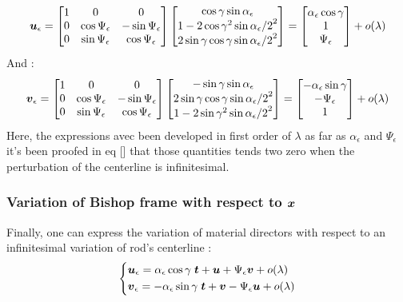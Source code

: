 \begin{equation}
	\boldsymbol{u}_\epsilon =
	\begin{bmatrix}
		1 & 0 & 0 \\
		0 & \cos{\Psi_\epsilon} & -\sin{\Psi_\epsilon} \\
		0 & \sin{\Psi_\epsilon} & \cos{\Psi_\epsilon} 
	\end{bmatrix}
	\begin{bmatrix}
		\cos{\gamma}\sin{\alpha_\epsilon} \\
		1-2\cos{\gamma}^2\sin{\alpha_\epsilon/2}^2 \\
		2\sin{\gamma}\cos{\gamma}\sin{\alpha_\epsilon/2}^2
	\end{bmatrix}
	=
	\begin{bmatrix}
		\alpha_\epsilon\cos{\gamma}\\
		1 \\
		\Psi_\epsilon
	\end{bmatrix}
	+ o(\lambda)
\end{equation}
And :
\begin{equation}
	\boldsymbol{v}_\epsilon =
	\begin{bmatrix}
		1 & 0 & 0 \\
		0 & \cos{\Psi_\epsilon} & -\sin{\Psi_\epsilon} \\
		0 & \sin{\Psi_\epsilon} & \cos{\Psi_\epsilon} 
	\end{bmatrix}
	\begin{bmatrix}
		-\sin{\gamma}\sin{\alpha_\epsilon} \\
		2\sin{\gamma}\cos{\gamma}\sin{\alpha_\epsilon/2}^2 \\
		1-2\sin{\gamma}^2\sin{\alpha_\epsilon/2}^2
	\end{bmatrix}
	=
	\begin{bmatrix}
		-\alpha_\epsilon\sin{\gamma}\\
		-\Psi_\epsilon \\
		1
	\end{bmatrix}
	+ o(\lambda)
\end{equation}
Here, the expressions avec been developed in first order of $\lambda$ as far as $\alpha_\epsilon$ and $\Psi_\epsilon$ it's been proofed in eq [] that those quantities tends two zero when the perturbation of the centerline is infinitesimal.

\subsubsection{Variation of Bishop frame with respect to $\boldsymbol{x}$}
Finally, one can express the variation of material directors with respect to an infinitesimal variation of rod's centerline :
\begin{equation}
	\left\{
	\begin{aligned}
		&\boldsymbol{u}_\epsilon = \alpha_\epsilon\cos{\gamma}\;\boldsymbol{t} + \boldsymbol{u} + \Psi_\epsilon\boldsymbol{v} + o(\lambda) \\
		&\boldsymbol{v}_\epsilon = -\alpha_\epsilon\sin{\gamma}\;\boldsymbol{t} + \boldsymbol{v} - \Psi_\epsilon\boldsymbol{u} + o(\lambda) \\
	\end{aligned}
	\right.
\end{equation}

